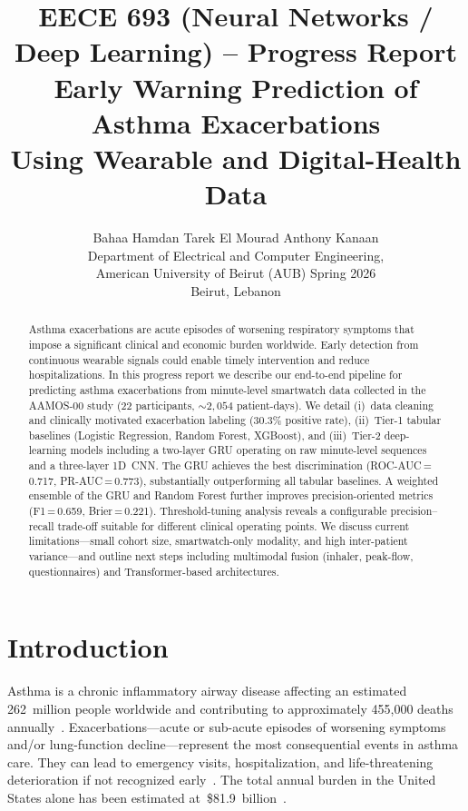 \documentclass[11pt,a4paper]{article}
\title{%
  \textbf{EECE 693 (Neural Networks / Deep Learning) – Progress Report}\\[6pt]
  \Large Early Warning Prediction of Asthma Exacerbations\\
  Using Wearable and Digital-Health Data}
\author{%
  Bahaa Hamdan \qquad Tarek El Mourad \qquad Anthony Kanaan \\[4pt]
  Department of Electrical and Computer Engineering,\\
  American University of Beirut (AUB) \qquad Spring 2026\\
  Beirut, Lebanon}
\date{}
\begin{document}
\maketitle

\begin{abstract}
Asthma exacerbations are acute episodes of worsening respiratory symptoms that
impose a significant clinical and economic burden worldwide.  Early detection
from continuous wearable signals could enable timely intervention and reduce
hospitalizations.  In this progress report we describe our end-to-end pipeline
for predicting asthma exacerbations from minute-level smartwatch data collected
in the AAMOS-00 study (22 participants, ${\sim}2{,}054$ patient-days).  We
detail (i)~data cleaning and clinically motivated exacerbation labeling
(30.3\% positive rate), (ii)~Tier-1 tabular baselines (Logistic Regression,
Random Forest, XGBoost), and (iii)~Tier-2 deep-learning models including
a two-layer GRU
operating on raw minute-level sequences and a three-layer 1D~CNN.  The GRU
achieves the best discrimination (ROC-AUC\,=\,0.717, PR-AUC\,=\,0.773),
substantially outperforming all tabular baselines.  A weighted ensemble of the
GRU and Random Forest further improves precision-oriented metrics
(F1\,=\,0.659, Brier\,=\,0.221).  Threshold-tuning analysis reveals a
configurable precision–recall trade-off suitable for different clinical
operating points.  We discuss current limitations—small cohort size,
smartwatch-only modality, and high inter-patient variance—and outline next
steps including multimodal fusion (inhaler, peak-flow, questionnaires) and
Transformer-based architectures.
\end{abstract}

\tableofcontents
\newpage

\section{Introduction}\label{sec:intro}

Asthma is a chronic inflammatory airway disease affecting an estimated
262~million people worldwide and contributing to approximately 455{,}000 deaths
annually~\cite{who2024}.  Exacerbations—acute or sub-acute episodes of
worsening symptoms and/or lung-function decline—represent the most
consequential events in asthma care.  They can lead to emergency visits,
hospitalization, and life-threatening deterioration if not recognized
early~\cite{bourdin2019}.  The total annual burden in the United States alone
has been estimated at~\$81.9~billion~\cite{nurmagambetov2018}.
\end{document}
